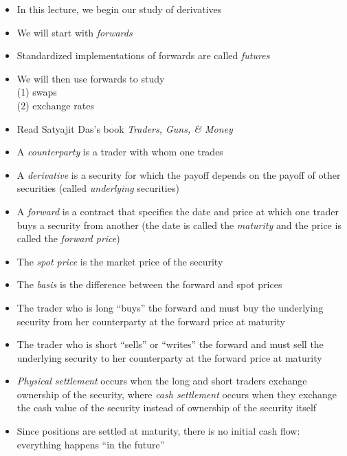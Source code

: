 \documentclass{beamer}
\begin{document}
\begin{frame}{}
	\begin{itemize}
		\item In this lecture, we begin our study of derivatives 
		\item We will start with \textit{forwards} 
		\item Standardized implementations of forwards are called \textit{futures}
		\item We will then use forwards to study\\
			(1) swaps\\ 
			(2) exchange rates
		\item Read Satyajit Das's book \textit{Traders, Guns, \& Money}
	\end{itemize}
\end{frame}

\begin{frame}{}
	\begin{itemize}
		\item A \textit{counterparty} is a trader with whom one trades
		\item A \textit{derivative} is a security for which the payoff depends on the payoff of other securities (called \textit{underlying} securities)
		\item A \textit{forward} is a contract that specifies the date and price at which one trader buys a security from another (the date is called the \textit{maturity} and the price is called the \textit{forward price}) 
		\item The \textit{spot price} is the market price of the security 
		\item The \textit{basis} is the difference between the forward and spot prices 
	\end{itemize}
\end{frame}

\begin{frame}{}
	\begin{itemize}
		\item The trader who is long ``buys'' the forward and must buy the underlying security from her counterparty at the forward price at maturity
		\item The trader who is short ``sells'' or ``writes'' the forward and must sell the underlying security to her counterparty at the forward price at maturity
		\item \textit{Physical settlement} occurs when the long and short traders exchange ownership  of the security, where \textit{cash settlement} occurs when they exchange the cash value of the security instead of ownership of the security itself 
		\item Since positions are settled at maturity, there is no initial cash flow: everything happens ``in the future''
    \end{itemize}
\end{frame}
\end{document}
